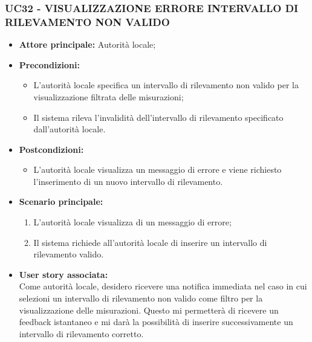 \subsubsection{UC32 - VISUALIZZAZIONE ERRORE INTERVALLO DI RILEVAMENTO NON VALIDO}
\begin{itemize}
    \item \textbf{Attore principale:} Autorità locale;
    \item \textbf{Precondizioni:}
        \begin{itemize} 
            \item L'autorità locale specifica un intervallo di rilevamento non valido per la visualizzazione filtrata delle misurazioni;
            \item Il sistema rileva l'invalidità dell'intervallo di rilevamento specificato dall'autorità locale.
        \end{itemize}
    \item \textbf{Postcondizioni:}
        \begin{itemize}
            \item L'autorità locale visualizza un messaggio di errore e viene richiesto l'inserimento di un nuovo intervallo di rilevamento.
        \end{itemize}
    \item \textbf{Scenario principale:}
            \begin{enumerate}
            \item L'autorità locale visualizza di un messaggio di errore;
            \item Il sistema richiede all'autorità locale di inserire un intervallo di rilevamento valido.
            \end{enumerate}
    \item \textbf{User story associata:} \\
        Come autorità locale, desidero ricevere una notifica immediata nel caso in cui selezioni un intervallo di rilevamento non valido come filtro per la visualizzazione delle misurazioni. Questo mi permetterà di ricevere un feedback istantaneo e mi darà la possibilità di inserire successivamente un intervallo di rilevamento corretto.
\end{itemize}